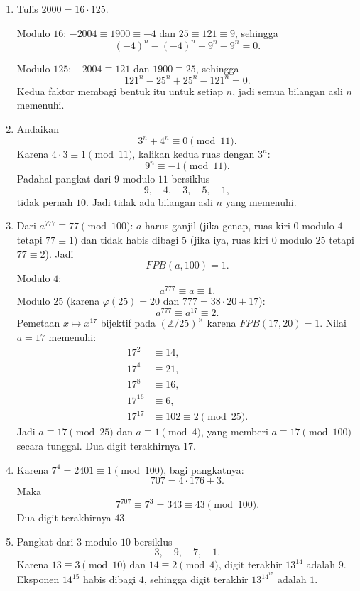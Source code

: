\documentclass[12pt]{scrartcl}
\begin{document}
\begin{enumerate}[resume]
	\item Tulis $2000 = 16 \cdot 125$.

	Modulo $16$: $-2004 \equiv 1900 \equiv -4$ dan $25 \equiv 121 \equiv 9$,
	sehingga
	\[ (-4)^n - (-4)^n + 9^n - 9^n = 0. \]

	Modulo $125$: $-2004 \equiv 121$ dan $1900 \equiv 25$,
	sehingga
	\[ 121^n - 25^n + 25^n - 121^n = 0. \]
	Kedua faktor membagi bentuk itu untuk setiap $n$,
	jadi semua bilangan asli $n$ memenuhi.

	\item Andaikan
	\[ 3^n + 4^n \equiv 0 \pmod{11}. \]
	Karena $4 \cdot 3 \equiv 1 \pmod{11}$, kalikan kedua ruas dengan $3^n$:
	\[ 9^n \equiv -1 \pmod{11}. \]
	Padahal pangkat dari $9$ modulo $11$ bersiklus
	\[ 9, \quad 4, \quad 3, \quad 5, \quad 1, \]
	tidak pernah $10$. Jadi tidak ada bilangan asli $n$ yang memenuhi.

	\item Dari $a^{777} \equiv 77 \pmod{100}$:
	$a$ harus ganjil (jika genap, ruas kiri $0$ modulo $4$ tetapi $77 \equiv 1$)
	dan tidak habis dibagi $5$ (jika iya, ruas kiri $0$ modulo $25$ tetapi $77 \equiv 2$).
	Jadi
	\[ FPB(a, 100) = 1. \]
	Modulo $4$:
	\[ a^{777} \equiv a \equiv 1. \]
	Modulo $25$ (karena $\varphi(25) = 20$ dan $777 = 38 \cdot 20 + 17$):
	\[ a^{777} \equiv a^{17} \equiv 2. \]
	Pemetaan $x \mapsto x^{17}$ bijektif pada $(\mathbb{Z}/25)^\times$
	karena $FPB(17, 20) = 1$.
	Nilai $a = 17$ memenuhi:
	\begin{align*}
	17^2 &\equiv 14, \\
	17^4 &\equiv 21, \\
	17^8 &\equiv 16, \\
	17^{16} &\equiv 6, \\
	17^{17} &\equiv 102 \equiv 2 \pmod{25}.
	\end{align*}
	Jadi $a \equiv 17 \pmod{25}$ dan $a \equiv 1 \pmod{4}$,
	yang memberi $a \equiv 17 \pmod{100}$ secara tunggal.
	Dua digit terakhirnya $17$.

	\item Karena $7^4 = 2401 \equiv 1 \pmod{100}$, bagi pangkatnya:
	\[ 707 = 4 \cdot 176 + 3. \]
	Maka
	\[ 7^{707} \equiv 7^3 = 343 \equiv 43 \pmod{100}. \]
	Dua digit terakhirnya $43$.

	\item Pangkat dari $3$ modulo $10$ bersiklus
	\[ 3, \quad 9, \quad 7, \quad 1. \]
	Karena $13 \equiv 3 \pmod{10}$ dan $14 \equiv 2 \pmod{4}$,
	digit terakhir $13^{14}$ adalah $9$.
	Eksponen $14^{15}$ habis dibagi $4$,
	sehingga digit terakhir $13^{14^{15}}$ adalah $1$.


\end{enumerate}
\end{document}

